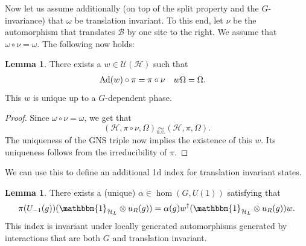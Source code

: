 \documentclass[12pt,a4paper,twoside]{article}
\let\originalleft\left
\let\originalright\right
\renewcommand{\left}{\mathopen{}\mathclose\bgroup\originalleft}
\renewcommand{\right}{\aftergroup\egroup\originalright}
\newcommand{\UU}{\mathcal U}
\newcommand{\BB}{\mathcal B}
\newcommand{\HH}{\mathcal H}
\newcommand{\id}{\mathbbm{1}}
\newcommand{\Ad}[1]{\textrm{Ad}\left(#1\right)}
\newcommand{\ue}{\underset{\text{u.e.}}{\sim}}
\theoremstyle{definition}
\newtheorem{lemma}[theorem]{Lemma}
\numberwithin{equation}{section}
\begin{document}
Now let us assume additionally (on top of the split property and the $G$-invariance) that $\omega$ be translation invariant. To this end, let $\nu$ be the automorphism that translates $\BB$ by one site to the right. We assume that $\omega\circ\nu=\omega$. The following now holds:
\begin{lemma}
	There exists a $w\in\UU(\HH)$ such that
	\begin{align}
		\Ad{w}\circ\pi&=\pi\circ\nu&w\Omega&=\Omega.
	\end{align}
	This $w$ is unique up to a $G$-dependent phase.
\end{lemma}
\begin{proof}
	Since $\omega\circ\nu=\omega$, we get that
	\begin{equation}
		(\HH,\pi\circ\nu,\Omega)\ue (\HH,\pi,\Omega).
	\end{equation}
	The uniqueness of the GNS triple now implies the existence of this $w$. Its uniqueness follows from the irreducibility of $\pi$.
\end{proof}
We can use this to define an additional 1d index for translation invariant states.
\begin{lemma}
	There exists a (unique) $\alpha\in\hom(G,U(1))$ satisfying that
	\begin{equation}
		\pi(U_{-1}(g)) (\id_{\HH_L}\otimes u_R(g))=\alpha(g)w^\dagger(\id_{\HH_L}\otimes u_R(g)) w.
	\end{equation}
	This index is invariant under locally generated automorphisms generated by interactions that are both $G$ and translation invariant.
\end{lemma}
\end{document}
